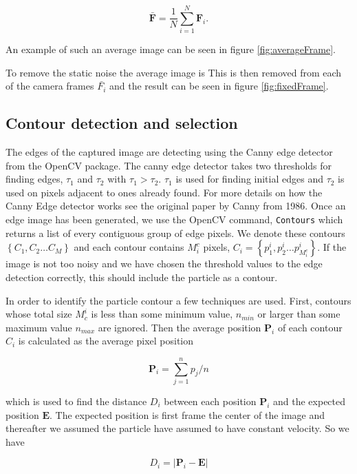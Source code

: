 \begin{equation}\label{eq:averageFrame}
\bar{\mathbf{F}} = \frac{1}{N}\sum\limits_{i=1}^{N} \mathbf{F}_i.
\end{equation}

An example of such an average image can be seen in figure \ref{fig:averageFrame}. 

To remove the static noise the average image is This is then removed from each of the camera frames $\bar{F_i}$ and the result can be seen in figure \ref{fig:fixedFrame}. 




\subsection{Contour detection and selection}
The edges of the captured image are detecting using the Canny edge detector from the OpenCV package. The canny edge detector takes two thresholds for finding edges, $\tau_1$ and $\tau_2$ with $\tau_1 > \tau_2$. $\tau_1$ is used for finding initial edges and $\tau_2$ is used on pixels adjacent to ones already found. For more details on how the Canny Edge detector works see the original paper by Canny from 1986\cite{Canny}. Once an edge image has been generated, we use the OpenCV command, \texttt{Contours} which returns a list of every contiguous group of edge pixels.  We denote these contours $\left\{C_1, C_2 \ldots C_M \right\}$ and each contour contains $M^c_i$ pixels, $C_i = \left\{p^i_1, p^i_2 \ldots p^i_{M^c_i}\right\} $. If the image is not too noisy and we have chosen the threshold values to the edge detection correctly, this should include the particle as a contour. 

In order to identify the particle contour  a few techniques are used. First, contours whose total size $ M_c^i$ is less than some minimum value, $ n_{min}$ or larger than some maximum value $n_{max}$ are ignored. Then the average position $\mathbf{P}_i$ of each contour $C_i$ is calculated as the average pixel position

\[
\mathbf{P}_i = \sum_{j=1}^n p_j/n
\]

which is used to find the distance $D_i$ between each position $\mathbf{P}_i$ and the expected position $\mathbf{E}$. The expected position is first frame the center of the image and thereafter we assumed the particle have assumed to have constant velocity. So we have 

\[
D_i = \left|\mathbf{P}_i - \mathbf{E}\right|
\]

